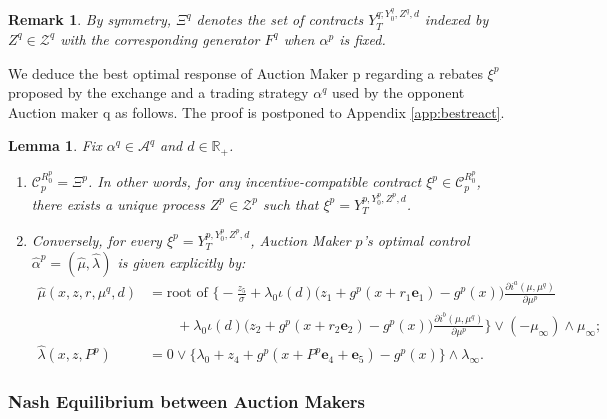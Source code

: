 \documentclass[12pt]{article}
\newtheorem{lemma}[theorem2]{Lemma}
\newtheorem{remark}[theorem2]{Remark}
\begin{document}
\begin{remark}
By symmetry, $\Xi^q$ denotes the set of contracts $Y_T^{q;Y_0^q,Z^q,d}$ indexed by $Z^q \in \mathcal{Z}^q$ with the corresponding generator $F^q$ when $\alpha^p$ is fixed. 
\end{remark}
We deduce the best optimal response of Auction Maker p regarding a rebates $\xi^p$ proposed by the exchange and a trading strategy $\alpha^q$ used by the opponent Auction maker q as follows. The proof is postponed to Appendix \ref{app:bestreact}.
\begin{lemma} \label{lemma:trader}
Fix $\alpha^q \in \mathcal{A}^q$ and $d \in \mathbb{R}_+$.

\begin{enumerate}
    \item $\mathcal{C}^{R_0^p}_p = \Xi^p$. In other words, for any incentive-compatible contract $\xi^p \in \mathcal{C}^{R_0^p}_p$, there exists a unique process $Z^p \in \mathcal{Z}^p$ such that $\xi^p = Y_T^{p,Y_0^p,Z^p,d}$.
    \item Conversely, for every $\xi^p = Y_T^{p,Y_0^p,Z^p,d}$, Auction Maker $p$'s optimal control $\hat{\alpha}^p = (\hat{\mu}, \hat{\lambda})$ is given explicitly by:
    \begin{align*}
        \hat{\mu}(x,z,r,\mu^{q},d) &= \text{root of } \Bigg\{ -\frac{z_5}{\sigma} + \lambda_0 \iota(d) \big(z_1 + g^p(x + r_1\mathbf{e}_1) - g^p(x) \big) \frac{\partial i^a(\mu,\mu^{q})}{\partial \mu^p} \\
        &\quad\quad + \lambda_0 \iota(d) \big(z_2 + g^p(x + r_2\mathbf{e}_2) - g^p(x) \big) \frac{\partial i^b(\mu,\mu^{q})}{\partial \mu^p} \Bigg\} \vee (-\mu_{\infty}) \wedge \mu_{\infty}; \\
        \hat{\lambda}(x,z,P^p) &= 0 \vee \Big\{ \lambda_0 + z_4 + g^p(x + P^p\mathbf{e}_4 + \mathbf{e}_5) - g^p(x) \Big\} \wedge \lambda_{\infty}.
    \end{align*}
\end{enumerate} 
\end{lemma}


\subsubsection{Nash Equilibrium between Auction Makers}
\label{sec:nash}
\end{document}
